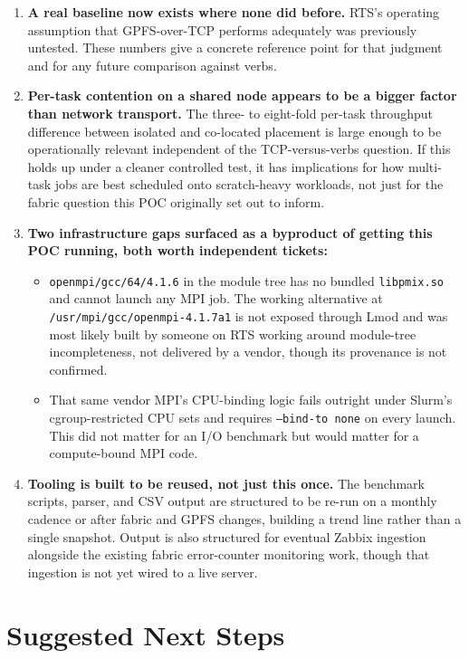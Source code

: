 \documentclass[11pt]{article}
\begin{document}
\begin{enumerate}
\item \textbf{A real baseline now exists where none did before.} RTS's operating assumption that GPFS-over-TCP performs adequately was previously untested. These numbers give a concrete reference point for that judgment and for any future comparison against verbs.

\item \textbf{Per-task contention on a shared node appears to be a bigger factor than network transport.} The three- to eight-fold per-task throughput difference between isolated and co-located placement is large enough to be operationally relevant independent of the TCP-versus-verbs question. If this holds up under a cleaner controlled test, it has implications for how multi-task jobs are best scheduled onto scratch-heavy workloads, not just for the fabric question this POC originally set out to inform.

\item \textbf{Two infrastructure gaps surfaced as a byproduct of getting this POC running, both worth independent tickets:}
\begin{itemize}
\item \texttt{openmpi/gcc/64/4.1.6} in the module tree has no bundled \texttt{libpmix.so} and cannot launch any MPI job. The working alternative at \texttt{/usr/mpi/gcc/openmpi-4.1.7a1} is not exposed through Lmod and was most likely built by someone on RTS working around module-tree incompleteness, not delivered by a vendor, though its provenance is not confirmed.
\item That same vendor MPI's CPU-binding logic fails outright under Slurm's cgroup-restricted CPU sets and requires \texttt{--bind-to none} on every launch. This did not matter for an I/O benchmark but would matter for a compute-bound MPI code.
\end{itemize}

\item \textbf{Tooling is built to be reused, not just this once.} The benchmark scripts, parser, and CSV output are structured to be re-run on a monthly cadence or after fabric and GPFS changes, building a trend line rather than a single snapshot. Output is also structured for eventual Zabbix ingestion alongside the existing fabric error-counter monitoring work, though that ingestion is not yet wired to a live server.
\end{enumerate}

\section*{Suggested Next Steps}
\end{document}
